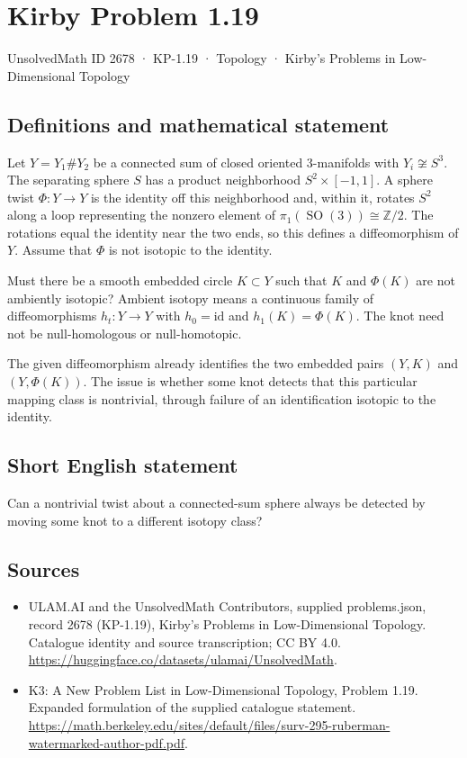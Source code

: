 \documentclass[11pt,a4paper]{article}
\begin{document}
\section*{Kirby Problem 1.19}\label{2678}
{\small UnsolvedMath ID 2678 · KP-1.19 · Topology · Kirby's Problems in Low-Dimensional Topology}
\subsection{Definitions and mathematical statement}
Let $Y=Y_1\#Y_2$ be a connected sum of closed oriented $3$-manifolds with
$Y_i\not\cong S^3$. The separating sphere $S$ has a product neighborhood
$S^2\times[-1,1]$.
A sphere twist $\Phi:Y\to Y$ is the identity off this neighborhood and, within it,
rotates $S^2$ along a loop representing the nonzero element of
$\pi_1(\operatorname{SO}(3))\cong\mathbb Z/2$. The rotations equal the identity
near the two ends, so this defines a diffeomorphism of $Y$.
Assume that $\Phi$ is not isotopic to the identity.

Must there be a smooth embedded circle $K\subset Y$ such that $K$ and $\Phi(K)$
are not ambiently isotopic? Ambient isotopy means a continuous family of
diffeomorphisms $h_t:Y\to Y$ with $h_0=\mathrm{id}$ and $h_1(K)=\Phi(K)$.
The knot need not be null-homologous or null-homotopic.

The given diffeomorphism already identifies the two embedded pairs
$(Y,K)$ and $(Y,\Phi(K))$. The issue is whether some knot detects that this
particular mapping class is nontrivial, through failure of an identification
isotopic to the identity.
\subsection{Short English statement}
Can a nontrivial twist about a connected-sum sphere always be detected by moving some knot to a different isotopy class?
\subsection{Sources}
\begin{itemize}
\item[S1] ULAM.AI and the UnsolvedMath Contributors, supplied problems.json, record 2678 (KP-1.19), Kirby's Problems in Low-Dimensional Topology. Catalogue identity and source transcription; CC BY 4.0.
\url{https://huggingface.co/datasets/ulamai/UnsolvedMath}.
\item[S2] K3: A New Problem List in Low-Dimensional Topology, Problem 1.19. Expanded formulation of the supplied catalogue statement.
\url{https://math.berkeley.edu/sites/default/files/surv-295-ruberman-watermarked-author-pdf.pdf}.
\end{itemize}
\end{document}
